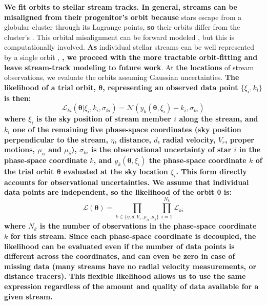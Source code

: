 \documentclass[twocolumn]{aastex63}
\newcommand{\changes}[1]{{\textbf{#1}}}
\begin{document}
\changes{We fit orbits to stellar stream tracks.
In general, streams can be misaligned from their progenitor's orbit because} stars escape from a globular cluster through its Lagrange points, \changes{so} their orbits differ from the cluster's \citep{eyre:2011}.
This orbital misalignment can be forward modeled \citep{varghese:2011, bonaca:2014, sanders:2014, bovy:2016}, but this is computationally involved.
\changes{As} individual stellar streams can be well represented by a single orbit \citep[e.g.,][]{koposov:2010, lux:2013, pwb, malhan:2019b, ibata:2019}, \changes{, we proceed with the more tractable orbit-fitting and leave stream-track modeling to future work}.
At \changes{the locations} of stream observations, we evaluate the orbits assuming Gaussian uncertainties.
\changes{The likelihood of a trial orbit, $\bm{\theta}$, representing an observed data point $\{\xi_i, k_i\}$ is then:}
\begin{equation}
\mathcal{L}_{ki}(\bm{\theta}|\xi_i,k_i,\sigma_{ki}) = \mathcal{N}(y_k(\bm{\theta}, \xi_i) - k_i, \sigma_{ki})
\end{equation}
\changes{where $\xi_i$ is the sky position of stream member $i$ along the stream, and $k_i$ one of the remaining five phase-space coordinates (sky position perpendicular to the stream, $\eta$, distance, $d$, radial velocity, $V_r$, proper motions, $\mu_\alpha$ and $\mu_\delta$), $\sigma_{ki}$ is the observational uncertainty of star $i$ in the phase-space coordinate $k$, and $y_k(\bm{\theta}, \xi_i)$ the phase-space coordinate $k$ of the trial orbit $\bm{\theta}$ evaluated at the sky location $\xi_i$.
This form directly accounts for observational uncertainties.
We assume that individual data points are independent, so the likelihood of the orbit $\bm{\theta}$ is:
\begin{equation}
\mathcal{L}(\bm{\theta}) = \prod_{k \in \{\eta, d, V_r, \mu_\alpha, \mu_\delta\}}\prod_{i=1}^{N_k}\mathcal{L}_{ki}
\end{equation}
where $N_k$ is the number of observations in the phase-space coordinate $k$ for this stream.
Since each phase-space coordinate is decoupled, the likelihood can be evaluated even if the number of data points is different across the coordinates, and can even be zero in case of missing data (many streams have no radial velocity measurements, or distance tracers).
This flexible likelihood allows us to use the same expression regardless of the amount and quality of data available for a given stream.
}
\end{document}
